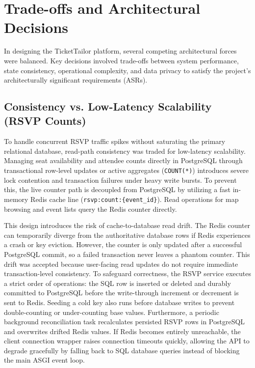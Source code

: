 \section{Trade-offs and Architectural Decisions}
\label{sec:tradeoffs}

In designing the TicketTailor platform, several competing architectural forces were balanced. Key decisions involved trade-offs between system performance, state consistency, operational complexity, and data privacy to satisfy the project's architecturally significant requirements (ASRs).

\subsection{Consistency vs. Low-Latency Scalability (RSVP Counts)}
To handle concurrent RSVP traffic spikes without saturating the primary relational database, read-path consistency was traded for low-latency scalability. Managing seat availability and attendee counts directly in PostgreSQL through transactional row-level updates or active aggregates (\texttt{COUNT(*)}) introduces severe lock contention and transaction failures under heavy write bursts. To prevent this, the live counter path is decoupled from PostgreSQL by utilizing a fast in-memory Redis cache line (\texttt{rsvp:count:\{event\_id\}}). Read operations for map browsing and event lists query the Redis counter directly.

This design introduces the risk of cache-to-database read drift. The Redis counter can temporarily diverge from the authoritative database rows if Redis experiences a crash or key eviction. However, the counter is only updated after a successful PostgreSQL commit, so a failed transaction never leaves a phantom counter. This drift was accepted because user-facing read updates do not require immediate transaction-level consistency. To safeguard correctness, the RSVP service executes a strict order of operations: the SQL row is inserted or deleted and durably committed to PostgreSQL before the write-through increment or decrement is sent to Redis. Seeding a cold key also runs before database writes to prevent double-counting or under-counting base values. Furthermore, a periodic background reconciliation task recalculates persisted RSVP rows in PostgreSQL and overwrites drifted Redis values. If Redis becomes entirely unreachable, the client connection wrapper raises connection timeouts quickly, allowing the API to degrade gracefully by falling back to SQL database queries instead of blocking the main ASGI event loop.


